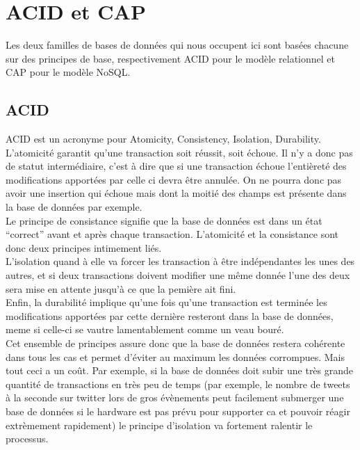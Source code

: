\documentclass[11pt]{article}
\begin{document}
\section{ACID et CAP}
Les deux familles de bases de données qui nous occupent ici sont basées chacune sur des principes de base, respectivement ACID pour le modèle relationnel et CAP pour le modèle NoSQL. \\
\subsection{ACID}
ACID est un acronyme pour Atomicity, Consistency, Isolation, Durability. L'atomicité garantit qu'une transaction soit réussit, soit échoue. Il n'y a donc pas de statut intermédiaire, c'est à dire que si une transaction échoue l'entièreté des modifications apportées par celle ci devra être annulée. On ne pourra donc pas avoir une insertion qui échoue mais dont la moitié des champs est présente dans la base de données par exemple. \\
Le principe de consistance signifie que la base de données est dans un état ``correct'' avant et après chaque transaction. L'atomicité et la consistance sont donc deux principes intimement liés. \\
L'isolation quand à elle va forcer les transaction à être indépendantes les unes des autres, et si deux transactions doivent modifier une même donnée l'une des deux sera mise en attente jusqu'à ce que la pemière ait fini. \\
Enfin, la durabilité implique qu'une fois qu'une transaction est terminée les modifications apportées par cette dernière resteront dans la base de données, meme si celle-ci se vautre lamentablement comme un veau bouré. \\
Cet ensemble de principes assure donc que la base de données restera cohérente dans tous les cas et permet d'éviter au maximum les données corrompues. Mais tout ceci a un coût. Par exemple, si la base de données doit subir une très grande quantité de transactions en très peu de temps (par exemple, le nombre de tweets à la seconde sur twitter lors de gros évènements peut facilement submerger une base de données si le hardware est pas prévu pour supporter ca et pouvoir réagir extrèmement rapidement) le principe d'isolation va fortement ralentir le processus.
\end{document}
